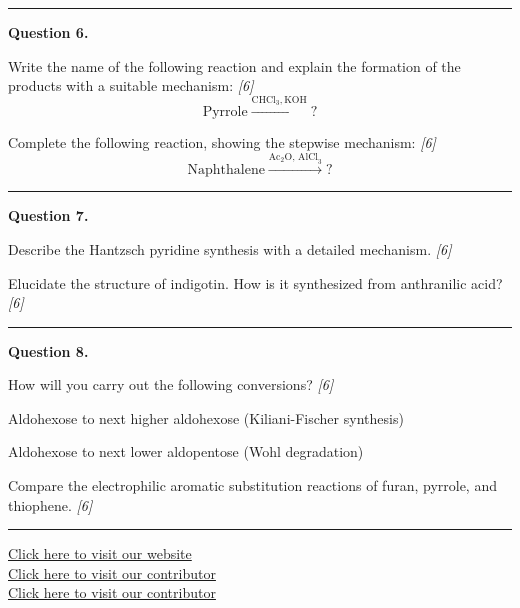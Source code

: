 \documentclass[11pt,a4paper]{article}
\newcommand{\pts}[1]{\hfill   \textit{[#1]}}
\begin{document}
\medskip\rule{\linewidth}{0.2pt}




\noindent   \textbf{Question 6.}

\begin{parts}
  \item Write the name of the following reaction and explain the formation of the products with a suitable mechanism: \pts{6}
    \[  \text{Pyrrole} \xrightarrow{ \text{CHCl}_3,  \text{KOH}} ? \]
  \item Complete the following reaction, showing the stepwise mechanism: \pts{6}
    \[  \text{Naphthalene} \xrightarrow{ \text{Ac}_2 \text{O, AlCl}_3} ? \]
\end{parts}

\medskip\rule{\linewidth}{0.2pt}




\noindent   \textbf{Question 7.}

\begin{parts}
  \item Describe the Hantzsch pyridine synthesis with a detailed mechanism. \pts{6}
  \item Elucidate the structure of indigotin. How is it synthesized from anthranilic acid? \pts{6}
\end{parts}

\medskip\rule{\linewidth}{0.2pt}




\noindent   \textbf{Question 8.}

\begin{parts}
  \item How will you carry out the following conversions? \pts{6}
  
\begin{parts}
    \item Aldohexose to next higher aldohexose (Kiliani-Fischer synthesis)
    \item Aldohexose to next lower aldopentose (Wohl degradation)
  \end{parts}
  \item Compare the electrophilic aromatic substitution reactions of furan, pyrrole, and thiophene. \pts{6}
\end{parts}

\vfill
\rule{\linewidth}{0.4pt}

\begin{center}\small
  \href{https://bhu-exam.vercel.app/}{Click here to visit our website}\\[4pt]
  \href{https://me-aryan.vercel.app/}{Click here to visit our contributor}\\[4pt]
  \href{https://quashan-me.vercel.app/}{Click here to visit our contributor}
\end{center}
\end{document}
